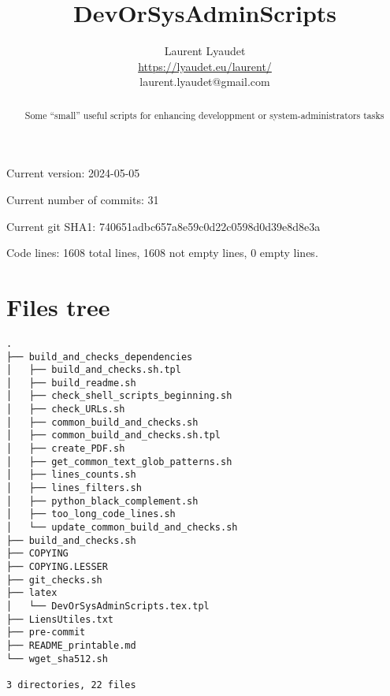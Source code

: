\documentclass{article}
\begin{document}
\author{
  Laurent Lyaudet\\
  \url{https://lyaudet.eu/laurent/}\\
  laurent.lyaudet@gmail.com
}
\title{DevOrSysAdminScripts}

\maketitle
\begin{abstract}
Some ``small'' useful scripts
for enhancing developpment or system-administrators tasks
\end{abstract}

Current version: 2024-05-05

Current number of commits: 31

Current git SHA1: 740651adbc657a8e59c0d22c0598d0d39e8d8e3a

Code lines: 1608 total lines, 1608 not empty lines, 0 empty lines.

\section{Files tree}
\label{section:tree}

\begin{verbatim}
.
├── build_and_checks_dependencies
│   ├── build_and_checks.sh.tpl
│   ├── build_readme.sh
│   ├── check_shell_scripts_beginning.sh
│   ├── check_URLs.sh
│   ├── common_build_and_checks.sh
│   ├── common_build_and_checks.sh.tpl
│   ├── create_PDF.sh
│   ├── get_common_text_glob_patterns.sh
│   ├── lines_counts.sh
│   ├── lines_filters.sh
│   ├── python_black_complement.sh
│   ├── too_long_code_lines.sh
│   └── update_common_build_and_checks.sh
├── build_and_checks.sh
├── COPYING
├── COPYING.LESSER
├── git_checks.sh
├── latex
│   └── DevOrSysAdminScripts.tex.tpl
├── LiensUtiles.txt
├── pre-commit
├── README_printable.md
└── wget_sha512.sh

3 directories, 22 files
\end{verbatim}
\end{document}
